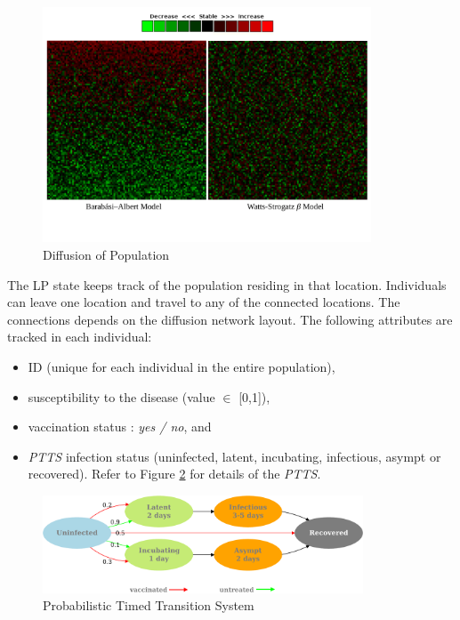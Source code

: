 \documentclass[11pt]{book}
\begin{document}
\begin{figure}
    \centering
    \includegraphics[width=0.87\textwidth]{figures/diffusion.pdf}
    \caption{Diffusion of Population} \label{fig:diffusion}
\end{figure}

\noindent
The LP state keeps track of the population residing in that location.  Individuals can leave one location and
travel to any of the connected locations.  The connections depends on the diffusion network layout.  The
following attributes are tracked in each individual:

\begin{itemize}
\item ID (unique for each individual in the entire population),
\item susceptibility to the disease (value $\in$ [0,1]),
\item vaccination status : \emph{yes / no}, and
\item \emph{PTTS} infection status (uninfected, latent, incubating, infectious, asympt or recovered). Refer to
  Figure \ref{fig:ptts} for details of the \emph{PTTS}.
\end{itemize}

\begin{figure}
  \centering
  \includegraphics[width=0.85\textwidth]{figures/ptts.pdf}
  \caption{Probabilistic Timed Transition System}\label{fig:ptts}
\end{figure}
\end{document}

